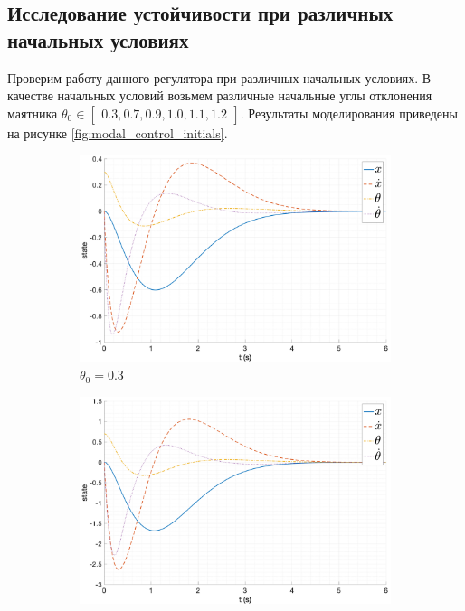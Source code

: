 \subsection{Исследование устойчивости при различных начальных условиях}
Проверим работу данного регулятора при различных начальных условиях. 
В качестве начальных условий возьмем различные начальные углы отклонения маятника $\theta_0 \in \begin{bmatrix}0.3, 0.7, 0.9, 1.0, 1.1, 1.2\end{bmatrix}$. Результаты 
моделирования приведены на рисунке \ref{fig:modal_control_initials}. 
\begin{figure}[ht!]
    \centering
    \begin{subfigure}[b]{0.45\textwidth}
        \includegraphics[width=\textwidth]{media/plots/modal_control/state_1.png}
        \caption{$\theta_0 = 0.3$}
    \end{subfigure}
    \begin{subfigure}[b]{0.45\textwidth}
        \includegraphics[width=\textwidth]{media/plots/modal_control/state_2.png}

\end{subfigure}
\end{figure}
